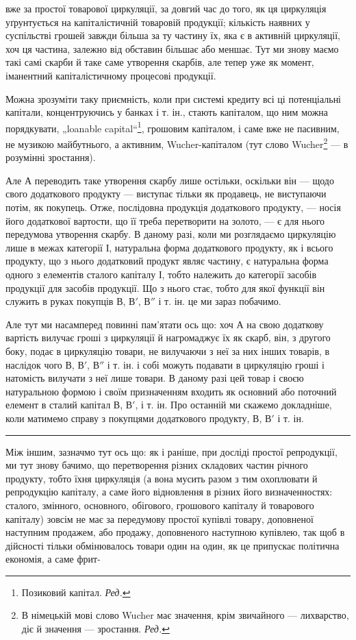 \parcont{}  %
вже за простої товарової циркуляції, за довгий час до того, як ця циркуляція
уґрунтується на капіталістичній товаровій продукції; кількість
наявних у суспільстві грошей завжди більша за ту частину їх, яка є
в активній циркуляції, хоч ця частина, залежно від обставин більшає
або меншає. Тут ми знову маємо такі самі скарби й таке саме утворення
скарбів, але тепер уже як момент, іманентний капіталістичному процесові
продукції.

Можна зрозуміти таку приємність, коли при системі кредиту всі ці
потенціальні капітали, концентруючись у банках і т. ін., стають капіталом,
що ним можна порядкувати, „loanable capital“\footnote*{
Позиковий капітал. \emph{Ред.}
}, грошовим капіталом,
і саме вже не пасивним, не музикою майбутнього, а активним,
Wucher-капіталом (тут слово Wucher\footnote*{
В німецькій мові слово Wucher має значення, крім звичайного — лихварство,
діє й значення — зростання. \emph{Ред.}
} — в розумінні зростання).

Але $А$ переводить таке утворення скарбу лише остільки, оскільки він —
щодо свого додаткового продукту — виступає тільки як продавець, не виступаючи
потім, як покупець. Отже, послідовна продукція додаткового
продукту, — носія його додаткової вартости, що її треба перетворити
на золото, — є для нього передумова утворення скарбу. В даному разі,
коли ми розглядаємо циркуляцію лише в межах категорії І, натуральна
форма додаткового продукту, як і всього продукту, що з нього додатковий
продукт являє частину, є натуральна форма одного з елементів
сталого капіталу І, тобто належить до категорії засобів продукції для
засобів продукції. Що з нього стає, тобто для якої функції він служить
в руках покупців $В$, $В'$, $В''$ і т. ін. це ми зараз побачимо.

Але тут ми насамперед повинні пам’ятати ось що: хоч $А$ на свою
додаткову вартість вилучає гроші з циркуляції й нагромаджує їх як
скарб, він, з другого боку, подає в циркуляцію товари, не вилучаючи
з неї за них інших товарів, в наслідок чого $В$, $В'$,  $В''$ і т. ін. і собі
можуть подавати в циркуляцію гроші і натомість вилучати з неї лише
товари. В даному разі цей товар і своєю натуральною формою і своїм
призначенням входить як основний або поточний елемент в сталий капітал
$В$, $В'$, і т. ін. Про останній ми скажемо докладніше, коли матимемо
справу з покупцями додаткового продукту, $В$, $В'$ і т. ін.

\pfbreak

Між іншим, зазначмо тут ось що: як і раніше, при досліді простої
репродукції, ми тут знову бачимо, що перетворення різних складових
частин річного продукту, тобто їхня циркуляція (а вона мусить разом
з тим охоплювати й репродукцію капіталу, а саме його відновлення
в різних його визначенностях: сталого, змінного, основного, обігового,
грошового капіталу й товарового капіталу) зовсім не має за передумову
простої купівлі товару, доповненої наступним продажем, або продажу,
доповненого наступною купівлею, так щоб в дійсності тільки обмінювалось
товари один на один, як це припускає політична економія, а саме фрит-
\parbreak{}  %

